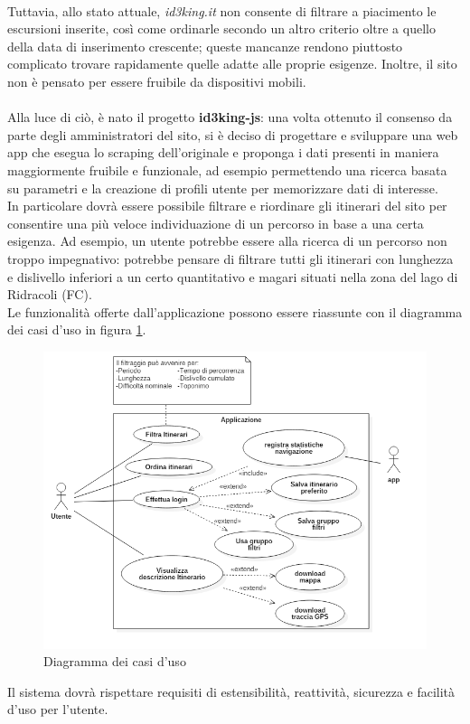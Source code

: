 \documentclass[11pt]{report}
\begin{document}
\\Tuttavia, allo stato attuale, \textit{id3king.it} non consente di filtrare a piacimento le escursioni inserite, così come ordinarle secondo un altro criterio oltre a quello della data di inserimento crescente; queste mancanze rendono piuttosto complicato trovare rapidamente quelle adatte alle proprie esigenze.
Inoltre, il sito non è pensato per essere fruibile da dispositivi mobili.
\\\\Alla luce di ciò, è nato il progetto \textbf{id3king-js}: una volta ottenuto il consenso da parte degli amministratori del sito, si è deciso di progettare e sviluppare una web app che esegua lo scraping dell'originale e proponga i dati presenti in maniera maggiormente fruibile e funzionale, ad esempio permettendo una ricerca basata su parametri e la creazione di profili utente per memorizzare dati di interesse.
\\In particolare dovrà essere possibile filtrare e riordinare gli itinerari del sito per consentire una più veloce individuazione di un percorso in base a una certa esigenza.
Ad esempio, un utente potrebbe essere alla ricerca di un percorso non troppo impegnativo: potrebbe pensare di filtrare tutti gli itinerari con lunghezza e dislivello inferiori a un certo quantitativo e magari situati nella zona del lago di Ridracoli (FC).
\\Le funzionalità offerte dall'applicazione possono essere riassunte con il diagramma dei casi d'uso in figura \ref{use_case_diagram}.
\begin{figure}
	\centering
	\includegraphics[scale=0.5]{use_case_diagram}
	\caption{Diagramma dei casi d'uso \label{use_case_diagram}}
\end{figure}
Il sistema dovrà rispettare requisiti di estensibilità, reattività, sicurezza e facilità d'uso per l'utente.
\pagebreak
\end{document}
